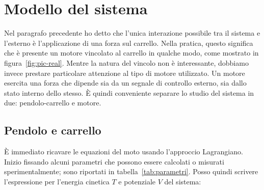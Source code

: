 \section{Modello del sistema}
Nel paragrafo precedente ho detto che l'unica interazione possibile tra il sistema
e l'esterno è l'applicazione di una forza sul carrello.
Nella pratica, questo significa che è presente un motore vincolato al carrello
in qualche modo, come mostrato in figura~\ref{fig:pic-real}.
Mentre la natura del vincolo non è interessante, dobbiamo invece prestare
particolare attenzione al tipo di motore utilizzato.
Un motore esercita una forza che dipende sia da un segnale di controllo esterno,
sia dallo stato interno dello stesso.
È quindi conveniente separare lo studio del sistema in due:
pendolo-carrello e motore.

\subsection{Pendolo e carrello}
È immediato ricavare le equazioni del moto usando l'approccio Lagrangiano.
Inizio fissando alcuni parametri che possono essere calcolati o misurati
sperimentalmente; sono riportati in tabella~\ref{tab:parametri}.
Posso quindi scrivere l'espressione per l'energia cinetica $T$
e potenziale $V$ del sistema:

